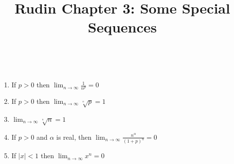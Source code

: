 \documentclass{article}
\title{Rudin Chapter 3: Some Special Sequences}
\begin{document}
\maketitle

\begin{proposition}
\

\begin{enumerate}
    \item If $p>0$ then $\lim_{n \to \infty} \frac{1}{n^p} = 0$
    \item If $p>0$ then $\lim_{n \to \infty} \sqrt[^n]{p} = 1$
    \item $\lim_{n \to \infty} \sqrt[^n]{n} = 1$
    \item If $p>0$ and $\alpha$ is real, then $\lim_{n\to \infty} \frac{n^\alpha}{(1+p)^n} = 0$
    \item If $\vert x \vert < 1$ then $\lim_{n \to \infty} x^n = 0$
\end{enumerate}
\end{proposition}
\end{document}
